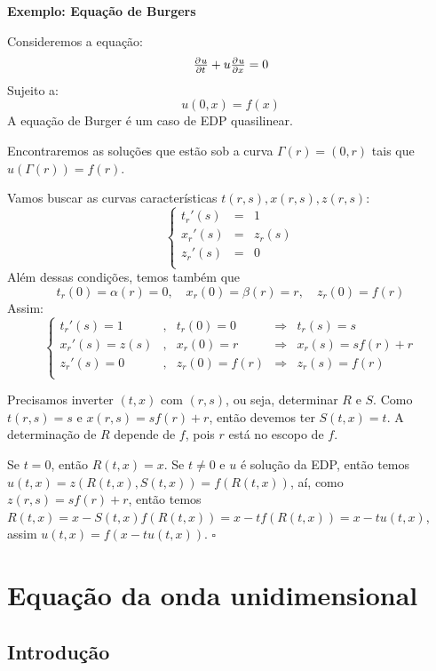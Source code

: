 \documentclass[11pt,twoside,a4paper]{book}
\begin{document}
\bigskip
\noindent
\textbf{Exemplo: Equação de Burgers}

\bigskip
\noindent
Consideremos a equação:
\begin{equation*}
    \pd{u}{t}+u\pd{u}{x}=0
\end{equation*}
Sujeito a:
\begin{equation*}
    u(0,x)=f(x)
\end{equation*}
A equação de Burger é um caso de EDP quasilinear.

\smallskip
\noindent
Encontraremos as soluções que estão sob a curva $\Gamma(r) = (0,r)$ tais que $u(\Gamma(r)) = f(r).$

\smallskip
\noindent
Vamos buscar as curvas características $t(r,s), x(r,s), z(r,s):$
\[
    \left\{\begin{array}{ccc}
    t_r'(s) & = & 1 \\
    x_r'(s) & = & z_r(s) \\
    z_r'(s) & = & 0 \\
    \end{array}\right.
\]
Além dessas condições, temos também que 
\[
t_r(0) = \alpha(r) = 0, \quad x_r(0) = \beta(r) = r, \quad z_r(0) = f(r)
\]
Assim:
\[
\left\{
\begin{array}{ccccc}
    t_r'(s) = 1 & , & t_r(0) = 0 & \Rightarrow & t_r(s) = s\\
    x_r'(s) = z(s) & , & x_r(0) = r & \Rightarrow & x_r(s) = sf(r) + r \\
    z_r'(s) = 0 & , & z_r(0) = f(r) & \Rightarrow & z_r(s) = f(r) \\
\end{array}
\right.
\]

\noindent
Precisamos inverter $(t,x)$ com $(r,s)$, ou seja, determinar $R$ e $S$. Como $t(r,s)=s$ e $x(r,s)=sf(r)+r$, então devemos ter $S(t,x)=t$. A determinação de $R$ depende de $f$, pois $r$ está no escopo de $f$.

\smallskip
\noindent
Se $t=0$, então $R(t,x)=x$. Se $t\neq 0$ e $u$ é solução da EDP, então temos $u(t,x)=z(R(t,x),S(t,x))=f(R(t,x))$, aí, como $z(r,s)=sf(r)+r$, então temos $R(t,x)=x-S(t,x)f(R(t,x))=x-tf(R(t,x))=x-tu(t,x)$, assim $u(t,x)=f(x-tu(t,x))$. $\square$

\section{Equação da onda unidimensional}

\subsection{Introdução}
\end{document}
